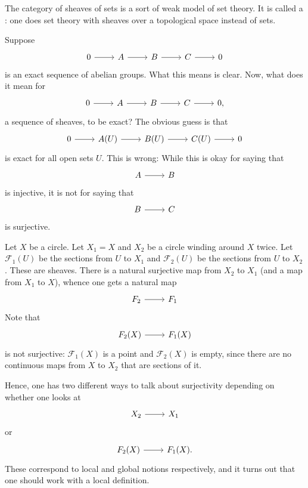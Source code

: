 \documentclass [11 pt, oneside] {article}
\begin{document}
The category of sheaves of sets is a sort of weak model of set theory. It is called a : one does set theory with sheaves over a topological space instead of sets.

Suppose
\[
\begin{tikzcd}
	0\ar[r]&A\ar[r]&B\ar[r]&C\ar[r]&0
\end{tikzcd}
\]
is an exact sequence of abelian groups. What this means is clear. Now, what does it mean for
\[
\begin{tikzcd}
        0\ar[r]&\mathscr{A}\ar[r]&\mathscr{B}\ar[r]&\mathscr{C}\ar[r]&0,
\end{tikzcd}
\]
a sequence of sheaves, to be exact? The obvious guess is that
\[
\begin{tikzcd}
	0\ar[r]&\mathscr{A}(U)\ar[r]&\mathscr{B}(U)\ar[r]&\mathscr{C}(U)\ar[r]&0
\end{tikzcd}
\]
is exact for all open sets $U$. This is wrong: While this is okay for saying that 
\[
\begin{tikzcd}
\mathscr{A}\ar[r]& \mathscr{B}
\end{tikzcd}
\]
is injective, it is not for saying that
\[
\begin{tikzcd}
\mathscr{B} \ar[r]& \mathscr{C}
\end{tikzcd}
\]
is surjective.

\begin{example}[ ]\label{}\text{}
Let $X$ be a circle. Let $X_1=X$ and $X_2$ be a circle winding around $X$ twice. Let $\mathscr{F}_1(U)$ be the sections from $U$ to $X_1$ and $\mathscr{F}_2(U)$ be the sections from $U$ to $X_2$. These are sheaves. There is a natural surjective map from $X_2$ to $X_1$ (and a map from $X_1$ to $X$), whence one gets a natural map 
\[
\begin{tikzcd}
\mathscr{F}_2\ar[r]& \mathscr{F}_1
\end{tikzcd}
\]
Note that 
\[
\begin{tikzcd}
\mathscr{F}_2(X) \ar[r]& \mathscr{F}_1(X)
\end{tikzcd}
\]
is not surjective: $\mathscr{F}_1(X)$ is a point and $\mathscr{F}_2(X)$ is empty, since there are no continuous maps from $X$ to $X_2$ that are sections of it.

Hence, one has two different ways to talk about surjectivity depending on whether one looks at 
\[
\begin{tikzcd}
X_2\ar[r]& X_1
\end{tikzcd}
\]
or 
\[
\begin{tikzcd}
\mathscr{F}_2(X) \ar[r]& \mathscr{F}_1(X).
\end{tikzcd}
\]
These correspond to local and global notions respectively, and it turns out that one should work with a local definition. 
\end{example}
\end{document}
